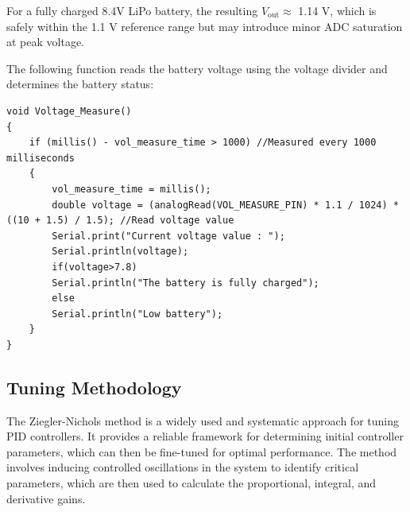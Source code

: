 For a fully charged 8.4V LiPo battery, the resulting $ V_{\text{out}} \approx $ 1.14 V, which is safely within the 1.1 V reference range but may introduce minor ADC saturation at peak voltage.

The following function reads the battery voltage using the voltage divider and determines the battery status:
\begin{lstlisting}[style=cppstyle2]
void Voltage_Measure()
{
	if (millis() - vol_measure_time > 1000) //Measured every 1000 milliseconds
	{
		vol_measure_time = millis();
		double voltage = (analogRead(VOL_MEASURE_PIN) * 1.1 / 1024) * ((10 + 1.5) / 1.5); //Read voltage value
		Serial.print("Current voltage value : ");
		Serial.println(voltage);
		if(voltage>7.8)
		Serial.println("The battery is fully charged");
		else
		Serial.println("Low battery");
	}
}
\end{lstlisting}


\subsection{Tuning Methodology}
The Ziegler-Nichols method is a widely used and systematic approach for tuning PID controllers. It provides a reliable framework for determining initial controller parameters, which can then be fine-tuned for optimal performance. The method involves inducing controlled oscillations in the system to identify critical parameters, which are then used to calculate the proportional, integral, and derivative gains.
